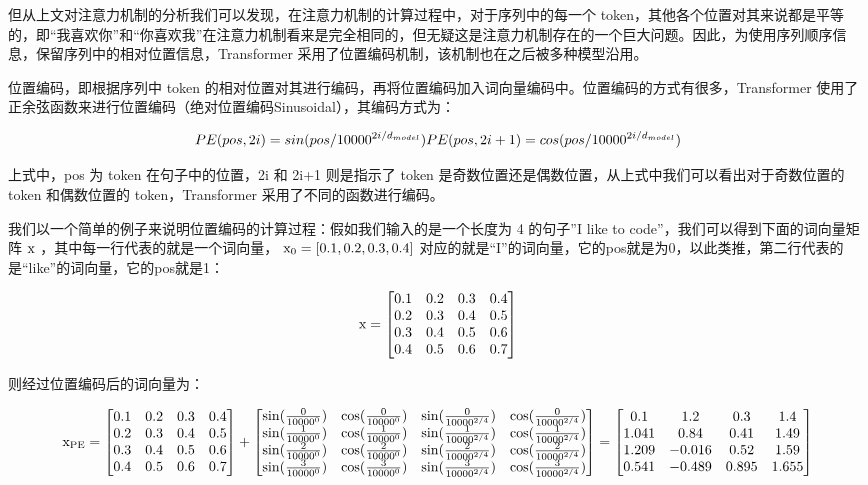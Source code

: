 \documentclass[12pt,a4paper]{book}
\begin{document}
但从上文对注意力机制的分析我们可以发现，在注意力机制的计算过程中，对于序列中的每一个
token，其他各个位置对其来说都是平等的，即``我喜欢你''和``你喜欢我''在注意力机制看来是完全相同的，但无疑这是注意力机制存在的一个巨大问题。因此，为使用序列顺序信息，保留序列中的相对位置信息，Transformer
采用了位置编码机制，该机制也在之后被多种模型沿用。

\hspace{0pt}位置编码，即根据序列中 token
的相对位置对其进行编码，再将位置编码加入词向量编码中。位置编码的方式有很多，Transformer
使用了正余弦函数来进行位置编码（绝对位置编码Sinusoidal），其编码方式为：

\[
PE(pos, 2i) = sin(pos/10000^{2i/d_{model}})\\
PE(pos, 2i+1) = cos(pos/10000^{2i/d_{model}})
\]

\hspace{0pt}上式中，pos 为 token 在句子中的位置，2i 和 2i+1 则是指示了
token 是奇数位置还是偶数位置，从上式中我们可以看出对于奇数位置的 token
和偶数位置的 token，Transformer 采用了不同的函数进行编码。

我们以一个简单的例子来说明位置编码的计算过程：假如我们输入的是一个长度为
4 的句子''I like to code''，我们可以得到下面的词向量矩阵 \(\rm x\)
，其中每一行代表的就是一个词向量， \(\rm x_0=[0.1,0.2,0.3,0.4]\)
对应的就是``I''的词向量，它的pos就是为0，以此类推，第二行代表的是``like''的词向量，它的pos就是1：

\[
\rm x = \begin{bmatrix} 0.1 & 0.2 & 0.3 & 0.4 \\ 0.2 & 0.3 & 0.4 & 0.5 \\ 0.3 & 0.4 & 0.5 & 0.6 \\ 0.4 & 0.5 & 0.6 & 0.7 \end{bmatrix}
\]

\hspace{0pt}则经过位置编码后的词向量为：

\[
\rm x_{PE} = \begin{bmatrix} 0.1 & 0.2 & 0.3 & 0.4 \\ 0.2 & 0.3 & 0.4 & 0.5 \\ 0.3 & 0.4 & 0.5 & 0.6 \\ 0.4 & 0.5 & 0.6 & 0.7 \end{bmatrix} + \begin{bmatrix} \sin(\frac{0}{10000^0}) & \cos(\frac{0}{10000^0}) & \sin(\frac{0}{10000^{2/4}}) & \cos(\frac{0}{10000^{2/4}}) \\ \sin(\frac{1}{10000^0}) & \cos(\frac{1}{10000^0}) & \sin(\frac{1}{10000^{2/4}}) & \cos(\frac{1}{10000^{2/4}}) \\ \sin(\frac{2}{10000^0}) & \cos(\frac{2}{10000^0}) & \sin(\frac{2}{10000^{2/4}}) & \cos(\frac{2}{10000^{2/4}}) \\ \sin(\frac{3}{10000^0}) & \cos(\frac{3}{10000^0}) & \sin(\frac{3}{10000^{2/4}}) & \cos(\frac{3}{10000^{2/4}}) \end{bmatrix} = \begin{bmatrix} 0.1 & 1.2 & 0.3 & 1.4 \\ 1.041 & 0.84 & 0.41 & 1.49 \\ 1.209 & -0.016 & 0.52 & 1.59 \\ 0.541 & -0.489 & 0.895 & 1.655 \end{bmatrix}
\]
\end{document}
